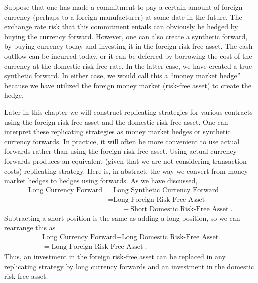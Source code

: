 Suppose that one has made a commitment to pay a certain amount of foreign currency (perhaps to a foreign manufacturer) at some date in the future.  The exchange rate risk that this commitment entails can obviously be hedged by buying the currency forward.  However, one can also create a synthetic forward, by buying currency today and investing it in the foreign risk-free asset.  The cash outflow can be incurred today, or it can be deferred by borrowing the cost of the currency at the domestic risk-free rate.  In the latter case, we have created a true synthetic forward.  In either case, we would call this a ``money market hedge''  because we have utilized the foreign money market (risk-free asset) to create the hedge.

Later in this chapter we will construct replicating strategies for various contracts using the foreign risk-free asset and the domestic risk-free asset.  One can interpret these replicating strategies as money market hedges or synthetic currency forwards.  In practice, it will often be more convenient to use actual forwards rather than using the foreign risk-free asset.  Using actual currency forwards produces an equivalent (given that we are not considering transaction costs) replicating strategy.   Here is, in abstract, the way we convert from money market hedges to hedges using forwards.  As we have discussed,
\begin{align*}
\text{Long Currency Forward} &= \text{Long Synthetic Currency Forward} \\
&= \text{Long Foreign Risk-Free Asset} \\
&\qquad + \text{Short Domestic Risk-Free Asset}\;.
\end{align*}
Subtracting a short position is the same as adding a long position, so we can rearrange this as
\begin{multline*}
\text{Long Currency Forward} + \text{Long Domestic Risk-Free Asset}\\=  \text{Long Foreign Risk-Free Asset} \; .
\end{multline*}
Thus, an investment in the foreign risk-free asset can be replaced in any replicating strategy by long currency forwards  and an investment in the domestic risk-free asset.  

